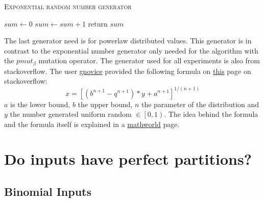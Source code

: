 \begin{algorithm}[h]
      \caption{\textsc{Exponential random number generator}}\label{alg:exponentialRNG}

      \DontPrintSemicolon %
      $sum \leftarrow 0$\; \tcp{random() generates a random value $\in \left[0, 1\right)$}
      {
            $sum \leftarrow sum+1$\;
      }
      return $sum$\;
\end{algorithm}

The last generator need is for powerlaw distributed values. This generator is in contrast to the exponential number generator only needed for the algorithm with the $pmut_\beta$ mutation operator. The generator used for all experiments is also from stackoverflow. The user \href{https://stackoverflow.com/users/52738/gnovice}{gnovice} provided the following formula on \href{https://stackoverflow.com/questions/918736/random-number-generator-that-produces-a-power-law-distribution}{this} page on stackoverflow: 
\[
      x = {[(b^{n+1} - q^{n+1})*y + a^{n+1}]}^{1/(n+1)}      
\]
$a$ is the lower bound, $b$ the upper bound, $n$ the parameter of the distribution and $y$ the number generated uniform random $\in \left[0, 1\right)$. The idea behind the formula and the formula itself is explained in a \href{https://mathworld.wolfram.com/RandomNumber.html}{mathworld} page.


\section{Do inputs have perfect partitions?}
\subsection{Binomial Inputs}

